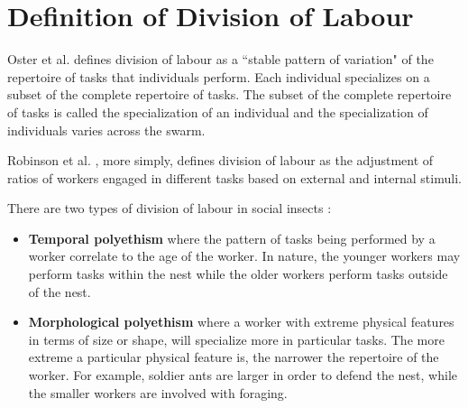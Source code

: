 \section{Definition of Division of Labour}
\label{sec:second:definition}

Oster et al. \cite{oster1978caste} defines division of labour as a ``stable pattern of variation" of the repertoire of tasks that individuals perform. Each individual specializes on a subset of the complete repertoire of tasks. The subset of the complete repertoire of tasks is called the specialization of an individual and the specialization of individuals varies across the swarm. 

Robinson et al. \cite{robinson1992regulation}, more simply, defines division of labour as the adjustment of ratios of workers engaged in different tasks based on external and internal stimuli.

There are two types of division of labour in social insects \cite{beshers2001models}: 
\begin{itemize}
	\item \textbf{Temporal polyethism} where the pattern of tasks being performed by a worker correlate to the age of the worker. In nature, the younger workers may perform tasks within the nest while the older workers perform tasks outside of the nest.
	\item \textbf{Morphological polyethism} where a worker with extreme physical features in terms of size or shape, will specialize more in particular tasks. The more extreme a particular physical feature is, the narrower the repertoire of the worker. For example, soldier ants are larger in order to defend the nest, while the smaller workers are involved with foraging.
\end{itemize}



